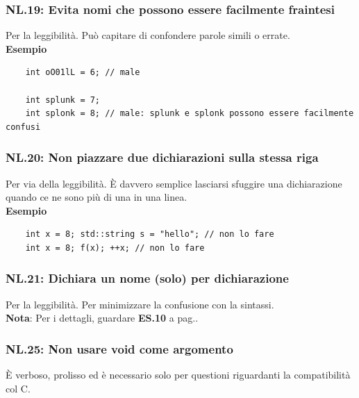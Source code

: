 \subsubsection{NL.19: Evita nomi che possono essere facilmente fraintesi}

\textsf{\small Per la leggibilità. Può capitare di confondere parole simili o errate.} \\

\textsf{\small \textbf{Esempio}}

\begin{lstlisting}
	int oO01lL = 6; // male
	
	int splunk = 7;
	int splonk = 8; // male: splunk e splonk possono essere facilmente confusi
\end{lstlisting}

\subsubsection{NL.20: Non piazzare due dichiarazioni sulla stessa riga}

\textsf{\small Per via della leggibilità. È davvero semplice lasciarsi sfuggire una dichiarazione quando ce ne sono più di una in una linea.} \\

\textsf{\small \textbf{Esempio}}

\begin{lstlisting}
	int x = 8; std::string s = "hello"; // non lo fare
	int x = 8; f(x); ++x; // non lo fare
\end{lstlisting}

\subsubsection{NL.21: Dichiara un nome (solo) per dichiarazione}

\textsf{\small Per la leggibilità. Per minimizzare la confusione con la sintassi.} \\ %

\textsf{\small \textbf{Nota}: Per i dettagli, guardare \textbf{ES.10} a pag.\textbf{\pageref{ES_10}}.} \\

\subsubsection{NL.25: Non usare void come argomento}

\textsf{\small È verboso, prolisso ed è necessario solo per questioni riguardanti la compatibilità col C.} \\

